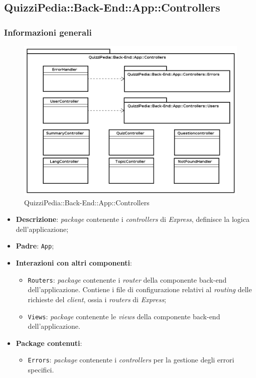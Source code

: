 \subsection{QuizziPedia::Back-End::App::Controllers}
\subsubsection{Informazioni generali}
\label{QuizziPedia::Back-End::App::Controllers}
\begin{figure}[ht]
	\centering
	\includegraphics[scale=0.6]{UML/Package/QuizziPedia_Back-End_App_Controllers.png}
	\caption{QuizziPedia::Back-End::App::Controllers}
\end{figure}
\FloatBarrier
	\begin{itemize}
		\item \textbf{Descrizione}:
		\textit{package} contenente i \textit{controllers} di \textit{Express}, definisce la logica dell'applicazione;
		\item \textbf{Padre}: \texttt{App};
		\item \textbf{Interazioni con altri componenti}:
			\begin{itemize}
				\item \texttt{Routers}:
				\textit{package} contenente i \textit{router} della componente back-end dell'applicazione. Contiene i file di configurazione relativi al \textit{routing} delle richieste del \textit{client}, ossia i \textit{routers} di \textit{Express};
				\item \texttt{Views}:
				\textit{package} contenente le \textit{views} della componente back-end dell'applicazione.
			\end{itemize}
		\item \textbf{Package contenuti}:
			\begin{itemize}
				\item \texttt{Errors}:
				\textit{package} contenente i \textit{controllers} per la gestione degli errori specifici.
			\end{itemize}
	\end{itemize}

